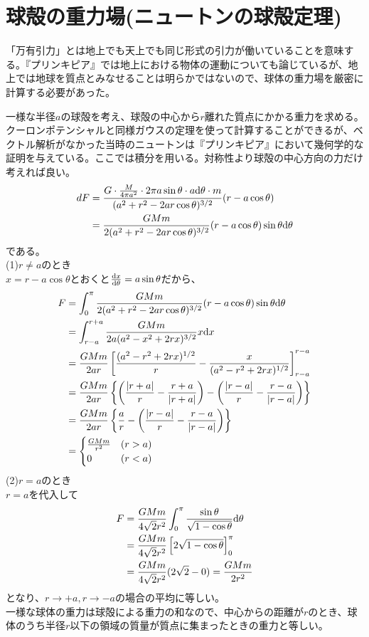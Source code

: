 
\section{球殻の重力場(ニュートンの球殻定理)}
	「万有引力」とは地上でも天上でも同じ形式の引力が働いていることを意味する。『プリンキピア』では地上における物体の運動についても論じているが、地上では地球を質点とみなせることは明らかではないので、球体の重力場を厳密に計算する必要があった。

	一様な半径$a$の球殻を考え、球殻の中心から$r$離れた質点にかかる重力を求める。クーロンポテンシャルと同様ガウスの定理を使って計算することができるが、ベクトル解析がなかった当時のニュートンは『プリンキピア』において幾何学的な証明を与えている。ここでは積分を用いる。対称性より球殻の中心方向の力だけ考えれば良い。
	\begin{align*}
		dF
        &= \frac{G \cdot \frac{M}{4\pi a^2}\cdot2\pi a\sin\theta \cdot a\d\theta \cdot m}{(a^2 + r^2 - 2ar\cos\theta)^{3/2}}(r - a\cos\theta)\\
		&= \frac{GMm}{2(a^2 + r^2 - 2ar\cos\theta)^{3/2}}(r - a\cos\theta)\sin\theta\d\theta
	\end{align*}
	である。\\
	(1)$r \neq a$のとき\\
		$x = r - a\cos\theta$とおくと$\de[x]{\theta} = a\sin\theta$だから、
		\begin{align*}
			F &= \int_0^\pi \frac{GMm}{2(a^2 + r^2 - 2ar\cos\theta)^{3/2}}(r - a\cos\theta)\sin\theta\d\theta\\
			&= \int_{r-a}^{r+a} \frac{GMm}{2a(a^2 - x^2 + 2rx)^{3/2}}x\d x\\
			&= \frac{GMm}{2ar} \llr{ \frac{(a^2 - r^2 + 2rx)^{1/2}}{r} - \frac{x}{(a^2 - r^2 + 2rx)^{1/2}} }_{r-a}^{r-a}\\
			&= \frac{GMm}{2ar} \mlr{ \lr{ \frac{|r+a|}{r} - \frac{r+a}{|r+a|} } - \lr{ \frac{|r-a|}{r} - \frac{r-a}{|r-a|} } }\\
			&= \frac{GMm}{2ar} \mlr{ \frac{a}{r} - \lr{ \frac{|r-a|}{r} - \frac{r-a}{|r-a|} } }\\
			&=
			\begin{cases}
				\frac{GMm}{r^2} & (r > a)\\
				0 & (r < a)
			\end{cases}
		\end{align*}
	(2)$r = a$のとき\\
		$r = a$を代入して
		\begin{align*}
			F &= \frac{GMm}{4\sqrt{2}r^2} \int_0^\pi \frac{\sin\theta}{\sqrt{1 - \cos\theta}} \d\theta\\
			&= \frac{GMm}{4\sqrt{2}r^2} \llr{2\sqrt{1 - \cos\theta}}_0^\pi\\
			&= \frac{GMm}{4\sqrt{2}r^2} (2\sqrt{2} - 0) = \frac{GMm}{2r^2}
		\end{align*}
		となり、$r \to +a, r \to -a$の場合の平均に等しい。\\
	一様な球体の重力は球殻による重力の和なので、中心からの距離が$r$のとき、球体のうち半径$r$以下の領域の質量が質点に集まったときの重力と等しい。


